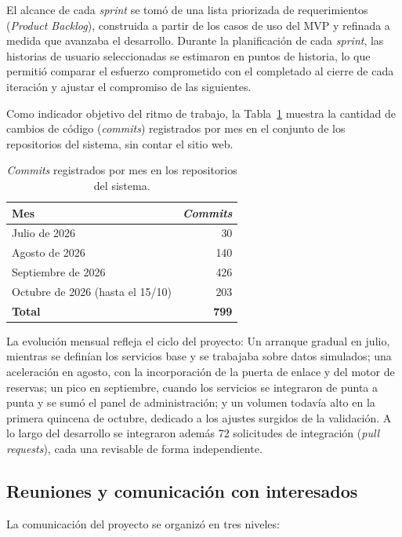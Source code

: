 El alcance de cada \textit{sprint} se tomó de una lista priorizada de requerimientos (\textit{Product Backlog}), construida a partir de los casos de uso del MVP y refinada a medida que avanzaba el desarrollo. Durante la planificación de cada \textit{sprint}, las historias de usuario seleccionadas se estimaron en puntos de historia, lo que permitió comparar el esfuerzo comprometido con el completado al cierre de cada iteración y ajustar el compromiso de las siguientes.

Como indicador objetivo del ritmo de trabajo, la Tabla~\ref{tab:commits} muestra la cantidad de cambios de código (\textit{commits}) registrados por mes en el conjunto de los repositorios del sistema, sin contar el sitio web.

\begin{table}[H]
\centering
\renewcommand{\arraystretch}{1.3}
\small
\begin{tabular}{l r}
\toprule
\textbf{Mes} & \textbf{\textit{Commits}} \\
\midrule
Julio de 2026 & 30 \\
Agosto de 2026 & 140 \\
Septiembre de 2026 & 426 \\
Octubre de 2026 (hasta el 15/10) & 203 \\
\midrule
\textbf{Total} & \textbf{799} \\
\bottomrule
\end{tabular}
\caption{\textit{Commits} registrados por mes en los repositorios del sistema.}
\label{tab:commits}
\end{table}

La evolución mensual refleja el ciclo del proyecto: Un arranque gradual en julio, mientras se definían los servicios base y se trabajaba sobre datos simulados; una aceleración en agosto, con la incorporación de la puerta de enlace y del motor de reservas; un pico en septiembre, cuando los servicios se integraron de punta a punta y se sumó el panel de administración; y un volumen todavía alto en la primera quincena de octubre, dedicado a los ajustes surgidos de la validación. A lo largo del desarrollo se integraron además 72 solicitudes de integración (\textit{pull requests}), cada una revisable de forma independiente.

\subsection{Reuniones y comunicación con interesados}

La comunicación del proyecto se organizó en tres niveles:

